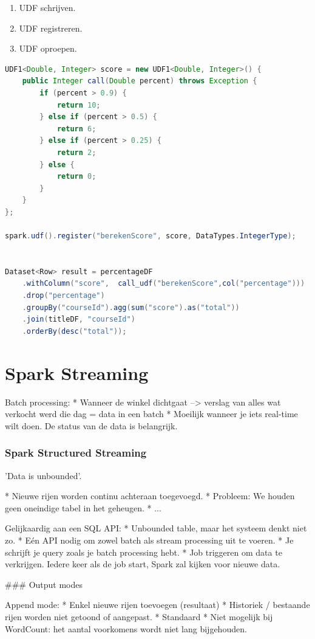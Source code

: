 \documentclass[a4paper,10pt,twoside]{report}
\begin{document}
\begin{enumerate}
	\item UDF schrijven.
	\item UDF registreren.
	\item UDF oproepen.
\end{enumerate}

\begin{lstlisting}[language=Java]
UDF1<Double, Integer> score = new UDF1<Double, Integer>() {
	public Integer call(Double percent) throws Exception {
		if (percent > 0.9) {
			return 10;
		} else if (percent > 0.5) {
			return 6;
		} else if (percent > 0.25) {
			return 2;
		} else {
			return 0;
		}
	}
};

spark.udf().register("berekenScore", score, DataTypes.IntegerType);


Dataset<Row> result = percentageDF
	.withColumn("score",  call_udf("berekenScore",col("percentage")))
	.drop("percentage")
	.groupBy("courseId").agg(sum("score").as("total"))
	.join(titleDF, "courseId")
	.orderBy(desc("total"));
\end{lstlisting}

\chapter{Spark Streaming}

Batch processing: 
* Wanneer de winkel dichtgaat --> verslag van alles wat verkocht werd die dag = data in een batch
* Moeilijk wanneer je iets real-time wilt doen. De status van de data is belangrijk.

\subsection{Spark Structured Streaming}

'Data is unbounded'.

* Nieuwe rijen worden continu achteraan toegevoegd.
* Probleem: We houden geen oneindige tabel in het geheugen. 
* ...

Gelijkaardig aan een SQL API:
* Unbounded table, maar het systeem denkt niet zo.
* Eén API nodig om zowel batch als stream processing uit te voeren.
* Je schrijft je query zoals je batch processing hebt.
* Job triggeren om data te verkrijgen. Iedere keer als de job start, Spark zal kijken voor nieuwe data.

### Output modes

Append mode:
* Enkel nieuwe rijen toevoegen (resultaat)
* Historiek / bestaande rijen worden niet getoond of aangepast.
* Standaard
* Niet mogelijk bij WordCount: het aantal voorkomens wordt niet lang bijgehouden.
\end{document}
